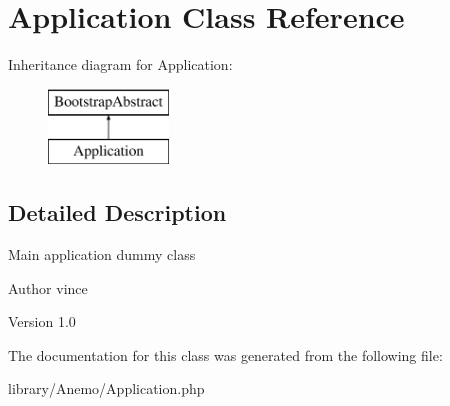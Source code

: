 \hypertarget{class_anemo_1_1_application}{
\section{Application Class Reference}
\label{class_anemo_1_1_application}
}
Inheritance diagram for Application:\begin{figure}[H]
\begin{center}
\leavevmode
\includegraphics[height=2.000000cm]{class_anemo_1_1_application}
\end{center}
\end{figure}


\subsection{Detailed Description}
Main application dummy class \begin{DoxyAuthor}{Author}
vince 
\end{DoxyAuthor}
\begin{DoxyVersion}{Version}
1.0 
\end{DoxyVersion}


The documentation for this class was generated from the following file:\begin{DoxyCompactItemize}
\item 
library/Anemo/Application.php\end{DoxyCompactItemize}
